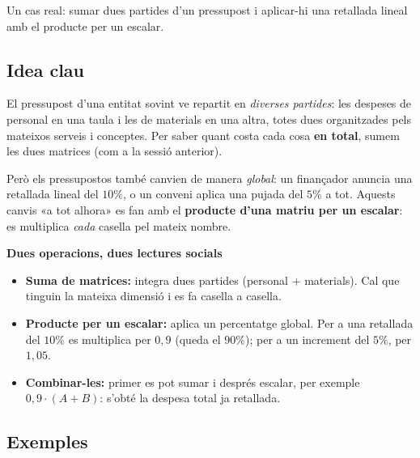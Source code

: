 %
{Un cas real: sumar dues partides d'un pressupost i aplicar-hi una retallada lineal amb el producte per un escalar.}

\subsection{Idea clau}

El pressupost d'una entitat sovint ve repartit en \emph{diverses partides}: les
despeses de personal en una taula i les de materials en una altra, totes dues
organitzades pels mateixos serveis i conceptes. Per saber quant costa cada cosa
\textbf{en total}, sumem les dues matrices (com a la sessió anterior).

Però els pressupostos també canvien de manera \emph{global}: un finançador
anuncia una retallada lineal del $10\%$, o un conveni aplica una pujada del $5\%$
a tot. Aquests canvis «a tot alhora» es fan amb el \textbf{producte d'una matriu
per un escalar}: es multiplica \emph{cada} casella pel mateix nombre.

\begin{idea}
\textbf{Dues operacions, dues lectures socials}
\begin{itemize}[leftmargin=1.4em, itemsep=2pt]
  \item \textbf{Suma de matrices:} integra dues partides (personal $+$ materials).
        Cal que tinguin la mateixa dimensió i es fa casella a casella.
  \item \textbf{Producte per un escalar:} aplica un percentatge global. Per a una
        retallada del $10\%$ es multiplica per $0{,}9$ (queda el $90\%$); per a un
        increment del $5\%$, per $1{,}05$.
  \item \textbf{Combinar-les:} primer es pot sumar i després escalar, per exemple
        $0{,}9\cdot(A+B)$: s'obté la despesa total ja retallada.
\end{itemize}
\end{idea}

\subsection{Exemples}

